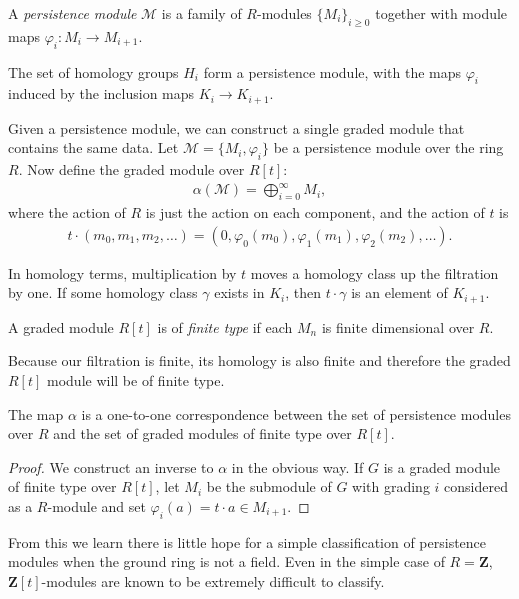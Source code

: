 \begin{definition}
A \emph{persistence module} $\mathcal{M}$ is a family of $R$-modules $\{ M_i \}_{i \geq 0}$ together with module maps $\varphi_i : M_i \to M_{i+1}$.
\end{definition}

The set of homology groups $H_i$ form a persistence module, with the maps $\varphi_i$ induced by the inclusion maps $K_i \to K_{i+1}$.

Given a persistence module, we can construct a single graded module that contains the same data. Let $\mathcal{M} = \{M_i, \varphi_i\}$ be a persistence module over the ring $R$. Now define the graded module over $R[t]$:
\begin{align*}
  \alpha(\mathcal{M}) = \bigoplus_{i=0}^\infty M_i,
\end{align*}
where the action of $R$ is just the action on each component, and the action of $t$ is
\begin{align*}
t \cdot (m_0, m_1, m_2, \dots) = (0, \varphi_0(m_0), \varphi_1(m_1), \varphi_2(m_2), \dots).
\end{align*}

In homology terms, multiplication by $t$ moves a homology class up the filtration by one. If some homology class $\gamma$ exists in $K_i$, then $t \cdot \gamma$ is an element of $K_{i+1}$.

\begin{definition}
A graded module $R[t]$ is of \emph{finite type} if each $M_n$ is finite dimensional over $R$.
\end{definition}

Because our filtration is finite, its homology is also finite and therefore the graded $R[t]$ module will be of finite type.

\begin{theorem}[Correspondence]
The map $\alpha$ is a one-to-one correspondence between the set of persistence modules over $R$ and the set of graded modules of finite type over $R[t]$.
\end{theorem}
\begin{proof}
We construct an inverse to $\alpha$ in the obvious way. If $G$ is a graded module of finite type over $R[t]$, let $M_i$ be the submodule of $G$ with grading $i$ considered as a $R$-module and set $\varphi_i(a) = t \cdot a \in M_{i+1}$.
\end{proof}

From this we learn there is little hope for a simple classification of persistence modules when the ground ring is not a field. Even in the simple case of $R=\mathbf{Z}$, $\mathbf{Z}[t]$-modules are known to be extremely difficult to classify.

